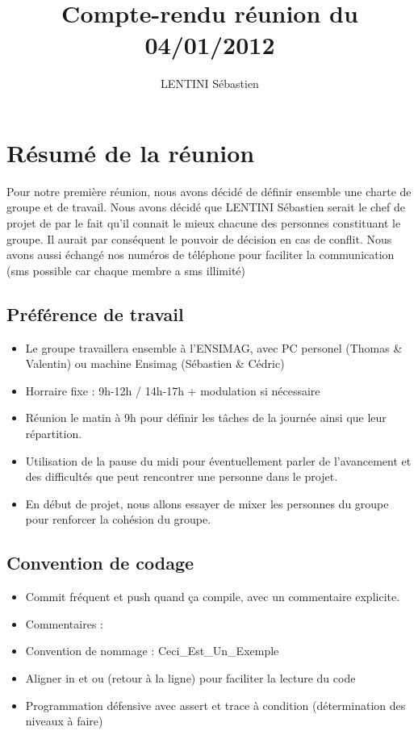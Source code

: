 \documentclass[10pt,a4paper]{article}
\author{LENTINI Sébastien}
\title{Compte-rendu réunion du 04/01/2012}
\begin{document}
\maketitle

\section{Résumé de la réunion}
Pour notre première réunion, nous avons décidé de définir ensemble une charte de groupe et de travail. Nous avons décidé que LENTINI Sébastien serait le chef de projet de par le fait qu'il connait le mieux chacune des personnes constituant le groupe. Il aurait par conséquent le pouvoir de décision en cas de conflit. Nous avons aussi échangé nos numéros de téléphone pour faciliter la communication (sms possible car chaque membre a sms illimité)

\subsection*{Préférence de travail}
\begin{itemize}
\item Le groupe travaillera ensemble à l'ENSIMAG, avec PC personel (Thomas \& Valentin) ou machine Ensimag (Sébastien \& Cédric)
\item Horraire fixe : 9h-12h / 14h-17h + modulation si nécessaire
\item Réunion le matin à 9h pour définir les tâches de la journée ainsi que leur répartition.
\item Utilisation de la pause du midi pour éventuellement parler de l'avancement et des difficultés que peut rencontrer une personne dans le projet. 
\item En début de projet, nous allons essayer de mixer les personnes du groupe pour renforcer la cohésion du groupe.
\end{itemize}

\subsection*{Convention de codage}

\begin{itemize}
\item Commit fréquent et push quand ça compile, avec un commentaire explicite.
\item Commentaires : 
\item Convention de nommage : Ceci\_Est\_Un\_Exemple
\item Aligner in et ou (retour à la ligne) pour faciliter la lecture du code
\item Programmation défensive avec assert et trace à condition (détermination des niveaux à faire)	   
\end{itemize}
\end{document}
